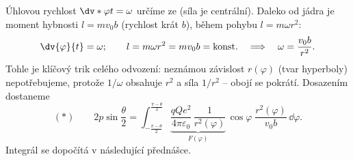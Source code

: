 Úhlovou rychlost $\dv*{\varphi}{t}=\omega$ určíme ze  (síla je centrální). Daleko od jádra je moment hybnosti $l = m v_0 b$ (rychlost krát  $b$), během pohybu $l = m\omega r^2$:
\begin{equation}
  \dv{\varphi}{t} = \omega ;\qquad l = m\omega r^2 = m v_0 b = \text{konst.}
  \quad\Longrightarrow\quad \omega = \frac{v_0 b}{r^2}.
\end{equation}
Tohle je klíčový trik celého odvození: neznámou závislost $r(\varphi)$ (tvar hyperboly) nepotřebujeme, protože $1/\omega$ obsahuje $r^2$ a síla $1/r^2$ -- obojí se pokrátí. Dosazením dostaneme
\begin{equation}
  (*)\qquad 2p\sin\frac{\theta}{2} = \int_{-\frac{\pi-\theta}{2}}^{\frac{\pi-\theta}{2}}
  \underbrace{\frac{qQe^2}{4\pi\varepsilon_0}\,\frac{1}{r^2(\varphi)}}_{F(\varphi)}\,\cos\varphi\;\frac{r^2(\varphi)}{v_0 b}\,\dd\varphi .
\end{equation}
Integrál se dopočítá v následující přednášce.
